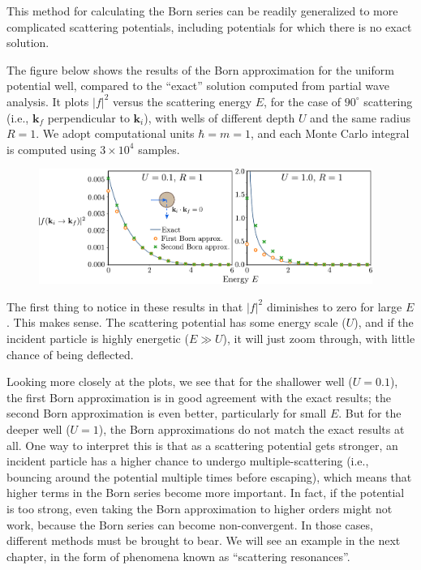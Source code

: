 \documentclass[pra,12pt]{revtex4}
\begin{document}
This method for calculating the Born series can be readily generalized
to more complicated scattering potentials, including potentials for
which there is no exact solution.

The figure below shows the results of the Born approximation for the
uniform potential well, compared to the ``exact'' solution computed
from partial wave analysis.  It plots $|f|^2$ versus the scattering
energy $E$, for the case of $90^\circ$ scattering (i.e.,
$\mathbf{k}_f$ perpendicular to $\mathbf{k}_i$), with wells of
different depth $U$ and the same radius $R = 1$.  We adopt
computational units $\hbar = m = 1$, and each Monte Carlo integral is
computed using $3\times10^4$ samples.

\begin{figure}[h]
  \centering\includegraphics[width=0.97\textwidth]{spherical_well_scattering}
\end{figure}

The first thing to notice in these results in that $|f|^2$ diminishes
to zero for large $E$.  This makes sense.  The scattering potential
has some energy scale ($U$), and if the incident particle is highly
energetic ($E \gg U$), it will just zoom through, with little chance
of being deflected.

Looking more closely at the plots, we see that for the shallower well
($U = 0.1$), the first Born approximation is in good agreement with
the exact results; the second Born approximation is even better,
particularly for small $E$.  But for the deeper well ($U = 1$), the
Born approximations do not match the exact results at all.  One way to
interpret this is that as a scattering potential gets stronger, an
incident particle has a higher chance to undergo multiple-scattering
(i.e., bouncing around the potential multiple times before escaping),
which means that higher terms in the Born series become more
important.  In fact, if the potential is too strong, even taking the
Born approximation to higher orders might not work, because the Born
series can become non-convergent.  In those cases, different methods
must be brought to bear.  We will see an example in the next chapter,
in the form of phenomena known as ``scattering resonances''.
\end{document}
